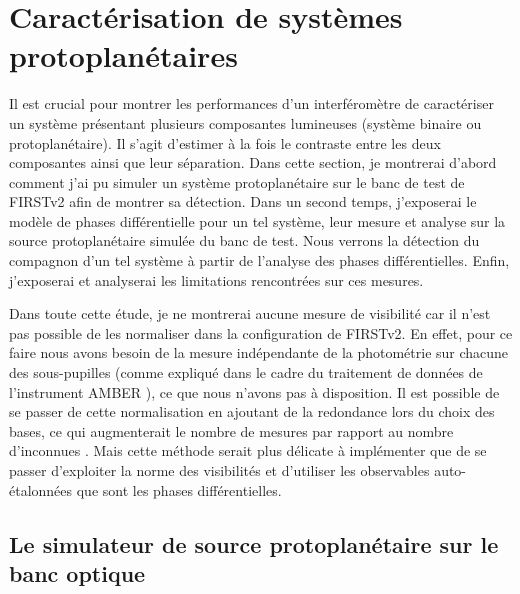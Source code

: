 \chapter{Caractérisation de systèmes protoplanétaires}
\label{sec:BinaryCharac}
\setcounter{figure}{0}
\setcounter{table}{0}
\setcounter{equation}{0}

\minitoc

\clearpage
Il est crucial pour montrer les performances d'un interféromètre de caractériser un système présentant plusieurs composantes lumineuses (système binaire ou protoplanétaire). Il s'agit d'estimer à la fois le contraste entre les deux composantes ainsi que leur séparation. Dans cette section, je montrerai d'abord comment j'ai pu simuler un système protoplanétaire sur le banc de test de \ac{FIRSTv2} afin de montrer sa détection. Dans un second temps, j'exposerai le modèle de phases différentielle pour un tel système, leur mesure et analyse sur la source protoplanétaire simulée du banc de test. Nous verrons la détection du compagnon d'un tel système à partir de l'analyse des phases différentielles. Enfin, j'exposerai et analyserai les limitations rencontrées sur ces mesures.

Dans toute cette étude, je ne montrerai aucune mesure de visibilité car il n'est pas possible de les normaliser dans la configuration de \ac{FIRSTv2}. En effet, pour ce faire nous avons besoin de la mesure indépendante de la photométrie sur chacune des sous-pupilles (comme expliqué dans le cadre du traitement de données de l'instrument \ac{AMBER} \citep{tatulli2007}), ce que nous n'avons pas à disposition. Il est possible de se passer de cette normalisation en ajoutant de la redondance lors du choix des bases, ce qui augmenterait le nombre de mesures par rapport au nombre d'inconnues \citep{lacour2007}. Mais cette méthode serait plus délicate à implémenter que de se passer d'exploiter la norme des visibilités et d'utiliser les observables auto-étalonnées que sont les phases différentielles.



\section{Le simulateur de source protoplanétaire sur le banc optique}
\label{sec:SystBinaire}

